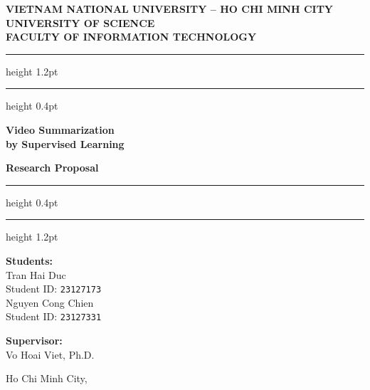 \documentclass[12pt, a4paper]{report}
\begin{document}
\begin{titlepage}
\thispagestyle{empty}
\begin{center}

  {\large\textbf{VIETNAM NATIONAL UNIVERSITY -- HO CHI MINH CITY}}\\[4pt]
  {\large\textbf{UNIVERSITY OF SCIENCE}}\\[4pt]
  {\large\textbf{FACULTY OF INFORMATION TECHNOLOGY}}

  \vspace{1.5cm}
  \hrule height 1.2pt
  \vspace{0.4cm}
  \hrule height 0.4pt
  \vspace{1.5cm}

  {\color{vnuBlue}\Huge\bfseries
    Video Summarization\\[8pt]
    by Supervised Learning
  }

  \vspace{0.8cm}
  {\Large\bfseries Research Proposal}

  \vspace{0.5cm}
  \hrule height 0.4pt
  \vspace{0.4cm}
  \hrule height 1.2pt
  \vspace{1.8cm}

  \begin{minipage}{0.48\textwidth}
    \raggedright
    \textbf{Students:}\\[4pt]
    \quad Tran Hai Duc\\
    \quad Student ID: \texttt{23127173}\\[6pt]
    \quad Nguyen Cong Chien\\
    \quad Student ID: \texttt{23127331}
  \end{minipage}
  \hfill
  \begin{minipage}{0.48\textwidth}
    \raggedleft
    \textbf{Supervisor:}\\[4pt]
    Vo Hoai Viet, Ph.D.
  \end{minipage}

  \vfill

  {\large Ho Chi Minh City, \the\year}

\end{center}
\end{titlepage}

\end{document}
